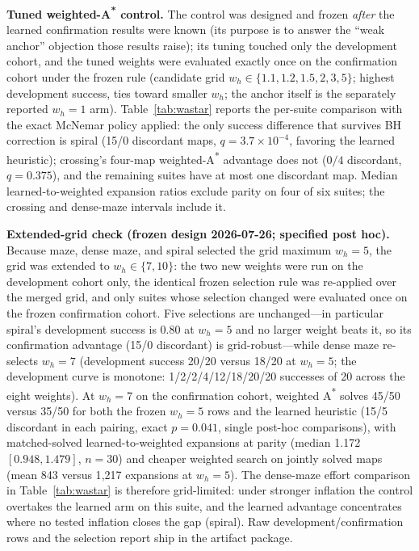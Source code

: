 \documentclass[letterpaper]{article} %
\begin{document}
\textbf{Tuned weighted-A\textsuperscript{*} control.} The control was designed and frozen \emph{after} the learned confirmation results were known (its purpose is to answer the ``weak anchor'' objection those results raise); its tuning touched only the development cohort, and the tuned weights were evaluated exactly once on the confirmation cohort under the frozen rule (candidate grid $w_h \in \{1.1, 1.2, 1.5, 2, 3, 5\}$; highest development success, ties toward smaller $w_h$; the anchor itself is the separately reported $w_h{=}1$ arm). Table~\ref{tab:wastar} reports the per-suite comparison with the exact McNemar policy applied: the only success difference that survives BH correction is spiral (15/0 discordant maps, $q{=}3.7{\times}10^{-4}$, favoring the learned heuristic); crossing's four-map weighted-A\textsuperscript{*} advantage does not ($0/4$ discordant, $q{=}0.375$), and the remaining suites have at most one discordant map. Median learned-to-weighted expansion ratios exclude parity on four of six suites; the crossing and dense-maze intervals include it.

\textbf{Extended-grid check (frozen design 2026-07-26; specified post hoc).} Because maze, dense maze, and spiral selected the grid maximum $w_h{=}5$, the grid was extended to $w_h \in \{7, 10\}$: the two new weights were run on the development cohort only, the identical frozen selection rule was re-applied over the merged grid, and only suites whose selection changed were evaluated once on the frozen confirmation cohort. Five selections are unchanged---in particular spiral's development success is 0.80 at $w_h{=}5$ and no larger weight beats it, so its confirmation advantage (15/0 discordant) is grid-robust---while dense maze re-selects $w_h{=}7$ (development success 20/20 versus 18/20 at $w_h{=}5$; the development curve is monotone: 1/2/2/4/12/18/20/20 successes of 20 across the eight weights). At $w_h{=}7$ on the confirmation cohort, weighted A\textsuperscript{*} solves 45/50 versus 35/50 for both the frozen $w_h{=}5$ rows and the learned heuristic (15/5 discordant in each pairing, exact $p{=}0.041$, single post-hoc comparisons), with matched-solved learned-to-weighted expansions at parity (median 1.172 $[0.948, 1.479]$, $n{=}30$) and cheaper weighted search on jointly solved maps (mean 843 versus 1{,}217 expansions at $w_h{=}5$). The dense-maze effort comparison in Table~\ref{tab:wastar} is therefore grid-limited: under stronger inflation the control overtakes the learned arm on this suite, and the learned advantage concentrates where no tested inflation closes the gap (spiral). Raw development/confirmation rows and the selection report ship in the artifact package.
\end{document}
